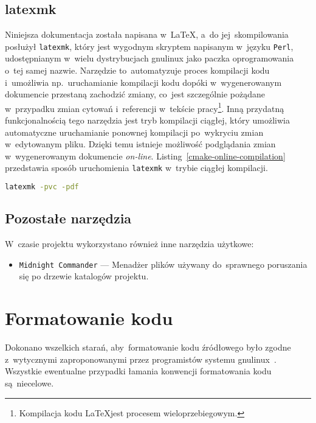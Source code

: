 \documentclass[thesis]{subfiles}
\begin{document}

\subsection{latexmk}

Niniejsza dokumentacja została napisana w~\LaTeX, a~do jej~skompilowania posłużył \texttt{latexmk}, który jest wygodnym skryptem napisanym w~języku \texttt{Perl}, udostępnianym w~wielu dystrybucjach \gls{gnulinux} jako paczka oprogramowania o~tej samej nazwie. Narzędzie to~automatyzuje proces kompilacji kodu i~umożliwia np.~uruchamianie kompilacji kodu dopóki w~wygenerowanym dokumencie przestaną zachodzić zmiany, co~jest szczególnie pożądane w~przypadku zmian cytowań i~referencji w~tekście pracy\footnote{Kompilacja kodu \LaTeX jest procesem wieloprzebiegowym.}. Inną przydatną funkcjonalnością tego narzędzia jest tryb kompilacji ciągłej, który umożliwia automatyczne uruchamianie ponownej kompilacji po~wykryciu zmian w~edytowanym pliku. Dzięki temu istnieje możliwość podglądania zmian w~wygenerowanym dokumencie \emph{on-line}. Listing~\ref{cmake-online-compilation} przedstawia sposób uruchomienia \texttt{latexmk} w~trybie ciągłej kompilacji.

\begin{lstlisting}[label=cmake-online-compilation,language=bash,numbers=none,caption={Uruchomienie ciągłej kompilacji domyślnego pliku \LaTeX, znalezionego w~aktualnym katalogu roboczym, do~pliku wyjściowego w~formacie~PDF}]
latexmk -pvc -pdf
\end{lstlisting}


\subsection{Pozostałe narzędzia}

W~czasie projektu wykorzystano również inne narzędzia użytkowe:
\begin{itemize}
\item \texttt{Midnight~Commander} --- Menadżer plików używany do~sprawnego poruszania się po drzewie katalogów projektu.
\end{itemize}


\section{Formatowanie kodu}

Dokonano wszelkich starań, aby~formatowanie kodu źródłowego było zgodne z~wytycznymi zaproponowanymi przez programistów  systemu \gls{gnulinux}~\cite{kernel-coding-style}. Wszystkie ewentualne przypadki łamania konwencji formatowania kodu są~niecelowe.
\end{document}

